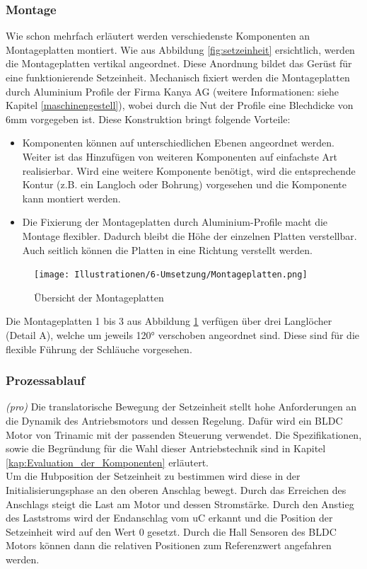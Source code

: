 \subsubsection{Montage}
Wie schon mehrfach erläutert werden verschiedenste Komponenten an Montageplatten montiert. Wie aus Abbildung \ref{fig:setzeinheit} ersichtlich, werden die Montageplatten vertikal angeordnet. Diese Anordnung bildet das Gerüst für eine funktionierende Setzeinheit. Mechanisch fixiert werden die Montageplatten durch Aluminium Profile der Firma Kanya AG (weitere Informationen: siehe Kapitel \ref{maschinengestell}), wobei durch die Nut der Profile eine Blechdicke von 6mm vorgegeben ist. Diese Konstruktion bringt folgende Vorteile:
	\begin{itemize}
	\item Komponenten können auf unterschiedlichen Ebenen angeordnet werden. Weiter ist das Hinzufügen von weiteren Komponenten auf einfachste Art realisierbar. Wird eine weitere Komponente benötigt, wird die entsprechende Kontur (z.B. ein Langloch oder Bohrung) vorgesehen und die Komponente kann montiert werden.

	\item Die Fixierung der Montageplatten durch Aluminium-Profile macht die Montage flexibler. Dadurch bleibt die Höhe der einzelnen Platten verstellbar. Auch seitlich können die Platten in eine Richtung verstellt werden.
\end{itemize}
 	\begin{figure}[H]
	\texttt{[image: Illustrationen/6-Umsetzung/Montageplatten.png]}
	\caption{Übersicht der Montageplatten}
	\label{fig:montageplatten}
\end{figure}
Die Montageplatten 1 bis 3 aus Abbildung \ref{fig:montageplatten} verfügen über drei Langlöcher (Detail A), welche um jeweils 120° verschoben angeordnet sind. Diese sind für die flexible Führung der Schläuche vorgesehen.

\subsubsection{Prozessablauf}
\textit{(pro)} Die translatorische Bewegung der Setzeinheit stellt hohe Anforderungen an die Dynamik des Antriebsmotors und dessen Regelung. Dafür wird ein BLDC Motor von Trinamic mit der passenden Steuerung verwendet. Die Spezifikationen, sowie die Begründung für die Wahl dieser Antriebstechnik sind in Kapitel \ref{kap:Evaluation_der_Komponenten} erläutert.
\\ Um die Hubposition der Setzeinheit zu bestimmen wird diese in der Initialisierungsphase an den oberen Anschlag bewegt. Durch das Erreichen des Anschlags steigt die Last am Motor und dessen Stromstärke. Durch den Anstieg des Laststroms wird der Endanschlag vom uC erkannt und die Position der Setzeinheit wird auf den Wert 0 gesetzt. Durch die Hall Sensoren des BLDC Motors können dann die relativen Positionen zum Referenzwert angefahren werden.

